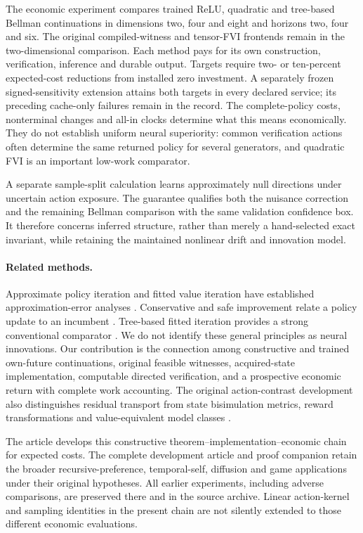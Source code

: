 The economic experiment compares trained ReLU, quadratic and tree-based Bellman continuations in dimensions two, four and eight and horizons two, four and six. The original compiled-witness and tensor-FVI frontends remain in the two-dimensional comparison. Each method pays for its own construction, verification, inference and durable output. Targets require two- or ten-percent expected-cost reductions from installed zero investment. A separately frozen signed-sensitivity extension attains both targets in every declared service; its preceding cache-only failures remain in the record. The complete-policy costs, nonterminal changes and all-in clocks determine what this means economically. They do not establish uniform neural superiority: common verification actions often determine the same returned policy for several generators, and quadratic FVI is an important low-work comparator.

A separate sample-split calculation learns approximately null directions under uncertain action exposure. The guarantee qualifies both the nuisance correction and the remaining Bellman comparison with the same validation confidence box. It therefore concerns inferred structure, rather than merely a hand-selected exact invariant, while retaining the maintained nonlinear drift and innovation model.

\paragraph{Related methods.}
Approximate policy iteration and fitted value iteration have established approximation-error analyses \citep{munos2003,munos2008,scherrer2015}. Conservative and safe improvement relate a policy update to an incumbent \citep{kakade2002,pirotta2013,metelli2021}. Tree-based fitted iteration provides a strong conventional comparator \citep{ernst2005}. We do not identify these general principles as neural innovations. Our contribution is the connection among constructive and trained own-future continuations, original feasible witnesses, acquired-state implementation, computable directed verification, and a prospective economic return with complete work accounting. The original action-contrast development also distinguishes residual transport from state bisimulation metrics, reward transformations and value-equivalent model classes \citep{ferns2004,ng1999,grimm2020}.

The article develops this constructive theorem--implementation--economic chain for expected costs. The complete development article and proof companion retain the broader recursive-preference, temporal-self, diffusion and game applications under their original hypotheses. All earlier experiments, including adverse comparisons, are preserved there and in the source archive. Linear action-kernel and sampling identities in the present chain are not silently extended to those different economic evaluations.
